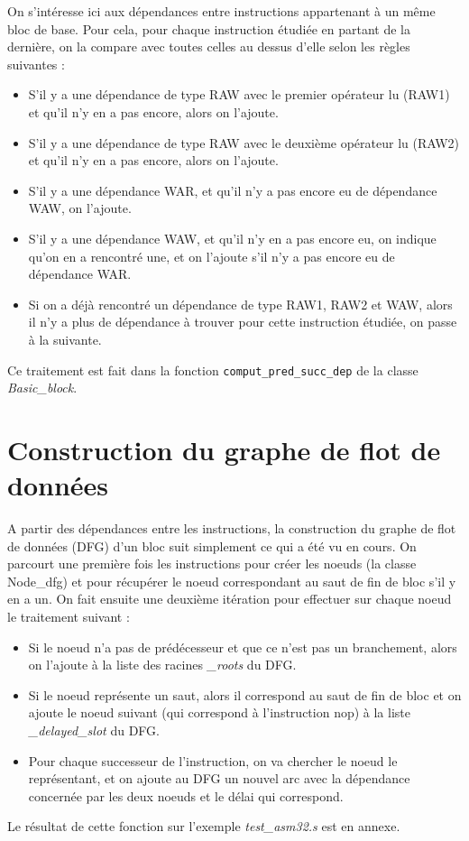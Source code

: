 \documentclass[a4paper, 11pt, notitlepage]{article}
\begin{document}
On s'intéresse ici aux dépendances entre instructions appartenant à un
même bloc de base. 
Pour cela, pour chaque instruction étudiée en partant de la dernière, on la compare avec toutes celles au dessus d'elle selon les règles suivantes :
\begin{itemize}
  \item S'il y a une dépendance de type RAW avec le premier opérateur
    lu (RAW1) et qu'il n'y en a pas encore, alors on l'ajoute.
  \item S'il y a une dépendance de type RAW avec le deuxième opérateur lu (RAW2) et qu'il n'y en a pas encore, alors on l'ajoute.
  \item S'il y a une dépendance WAR, et qu'il n'y a pas encore eu de dépendance WAW, on l'ajoute.
  \item S'il y a une dépendance WAW, et qu'il n'y en a pas encore eu, on indique qu'on en a rencontré une, et on l'ajoute s'il n'y a pas encore eu de dépendance WAR.
  \item Si on a déjà rencontré un dépendance de type RAW1, RAW2 et WAW, alors il n'y a plus de dépendance à trouver pour cette instruction étudiée, on passe à la suivante.
\end{itemize}
Ce traitement est fait
dans la fonction \verb |comput_pred_succ_dep| de la classe
\emph{Basic\_block}. 

\section{Construction du graphe de flot de données}

A partir des dépendances entre les instructions, la construction
du graphe de flot de données (DFG) d'un bloc suit simplement ce qui a été vu en cours. 
On parcourt une première fois les instructions pour créer les noeuds (la classe Node\_dfg) et pour récupérer le noeud correspondant au saut de fin de bloc s'il y en a un. On fait ensuite
une deuxième itération pour effectuer sur chaque noeud le traitement suivant : 
\begin{itemize}
\item Si le noeud n'a pas de prédécesseur et que ce n'est pas un branchement, alors on l'ajoute à la liste des racines \emph{\_roots} du DFG. 
\item Si le noeud représente un saut, alors il correspond au saut de fin de
  bloc et on ajoute le noeud suivant (qui correspond à l'instruction nop) à la liste \emph{\_delayed\_slot} du DFG.
\item Pour chaque successeur de l'instruction, on va chercher le noeud le
  représentant, et on ajoute au DFG un nouvel arc avec la
  dépendance concernée par les deux noeuds et le délai qui correspond. 
\end{itemize}
Le résultat de cette fonction sur l'exemple \emph{test\_asm32.s} est en annexe.
\end{document}
